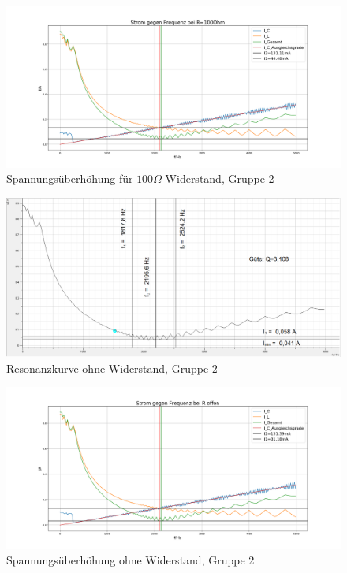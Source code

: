 \documentclass[a4paper, 11pt]{article}
\begin{document}
\begin{figure}[H]
	\hskip-2cm
	\includegraphics[trim = 0mm 0mm 0mm 0mm,clip, width=20cm]{Bilder/JOParallel100_Erhoehung.png}%
	\caption[Spannungsüberhöhung für $100 \Omega$ Widerstand, Gruppe 1]{Spannungsüberhöhung für $100 \Omega$ Widerstand, Gruppe 2}%
	\label{pic:Abbildung 3}%
\end{figure}
\begin{figure}[H]
	\hskip-2cm
	\includegraphics[trim = 0mm 0mm 0mm 0mm,clip, width=20cm]{Bilder/JOParalleloo_Breite.png}%
	\caption[Resonanzkurve ohne Widerstand, Gruppe 1]{Resonanzkurve ohne Widerstand, Gruppe 2}%
	\label{pic:Abbildung 3}%
\end{figure}
\begin{figure}[H]
	\hskip-2cm
	\includegraphics[trim = 0mm 0mm 0mm 0mm,clip, width=20cm]{Bilder/JOParalleloo_Erhoehung.png}%
	\caption[Spannungsüberhöhung ohne Widerstand, Gruppe 1]{Spannungsüberhöhung ohne Widerstand, Gruppe 2}%
	\label{pic:Abbildung 3}%
\end{figure}
\end{document}
